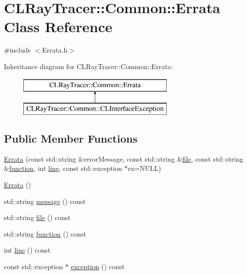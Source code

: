 \hypertarget{class_c_l_ray_tracer_1_1_common_1_1_errata}{}\section{C\+L\+Ray\+Tracer\+:\+:Common\+:\+:Errata Class Reference}
\label{class_c_l_ray_tracer_1_1_common_1_1_errata}


{\ttfamily \#include $<$Errata.\+h$>$}

Inheritance diagram for C\+L\+Ray\+Tracer\+:\+:Common\+:\+:Errata\+:\begin{figure}[H]
\begin{center}
\leavevmode
\includegraphics[height=2.000000cm]{class_c_l_ray_tracer_1_1_common_1_1_errata}
\end{center}
\end{figure}
\subsection*{Public Member Functions}
\begin{DoxyCompactItemize}
\item 
\hyperlink{class_c_l_ray_tracer_1_1_common_1_1_errata_a9b1f1e49c3415661fabd8aaa1cfd5534}{Errata} (const std\+::string \&error\+Message, const std\+::string \&\hyperlink{class_c_l_ray_tracer_1_1_common_1_1_errata_ab02c644698211e5b40a9eb8504c4ebfa}{file}, const std\+::string \&\hyperlink{class_c_l_ray_tracer_1_1_common_1_1_errata_ac591fef29757e5309cefa5f96e2f647f}{function}, int \hyperlink{class_c_l_ray_tracer_1_1_common_1_1_errata_ae53b458949d7a8b1438f72086dee9d6d}{line}, const std\+::exception $\ast$ex=N\+U\+LL)
\item 
\hyperlink{class_c_l_ray_tracer_1_1_common_1_1_errata_af49c6b9944517bc3ef964fb9ef71b8f8}{Errata} ()
\item 
std\+::string \hyperlink{class_c_l_ray_tracer_1_1_common_1_1_errata_ac2ea1fe3bebe8db7b6e0e0bf7ca68fb6}{message} () const 
\item 
std\+::string \hyperlink{class_c_l_ray_tracer_1_1_common_1_1_errata_ab02c644698211e5b40a9eb8504c4ebfa}{file} () const 
\item 
std\+::string \hyperlink{class_c_l_ray_tracer_1_1_common_1_1_errata_ac591fef29757e5309cefa5f96e2f647f}{function} () const 
\item 
int \hyperlink{class_c_l_ray_tracer_1_1_common_1_1_errata_ae53b458949d7a8b1438f72086dee9d6d}{line} () const 
\item 
const std\+::exception $\ast$ \hyperlink{class_c_l_ray_tracer_1_1_common_1_1_errata_a46e07afff80d38698637dff13edff67f}{exception} () const 
\end{DoxyCompactItemize}
